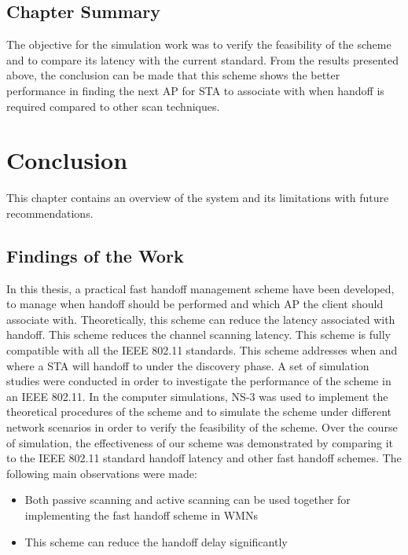 \documentclass[12pt,a4paper]{report}
\begin{document}
\section{Chapter Summary}
The objective for the simulation work was to verify the feasibility of the scheme and to compare its latency with the current standard. From the results presented above, the conclusion can be made that this scheme shows the better performance in finding the next AP for STA to associate with when handoff is required compared to other scan techniques.

\chapter{Conclusion}
This chapter contains an overview of the system and its limitations with future recommendations.
\section{ Findings of the Work}
In this thesis, a practical fast handoff management scheme have been developed, to manage when handoff should be performed and which AP the client should associate with. Theoretically, this scheme can reduce the latency associated with handoff. This scheme reduces the channel scanning latency. This scheme is fully compatible with all the IEEE 802.11 standards. This scheme addresses when and where a STA will handoff to under the discovery phase. A set of simulation studies were conducted in order to investigate the performance of the scheme in an IEEE 802.11. In the computer simulations, NS-3 was used to implement the theoretical procedures of the scheme and to simulate the scheme under different network scenarios in order to verify the feasibility of the scheme.
Over the course of simulation, the effectiveness of our scheme was demonstrated by comparing it to the IEEE 802.11 standard handoff latency and other fast handoff schemes. The following main observations were made:
\begin{itemize}
\item 
Both passive scanning and active scanning can be used together for implementing the fast handoff scheme in WMNs
\item 
This scheme can reduce the handoff delay significantly
\end{itemize}
\end{document}
